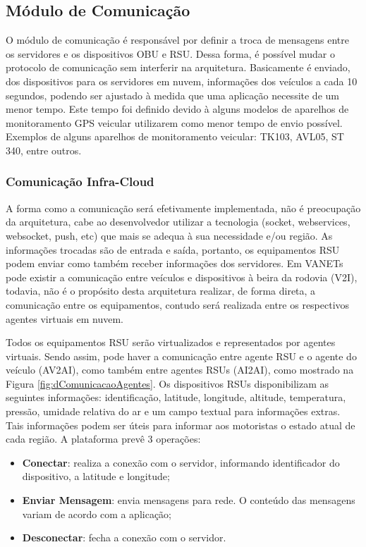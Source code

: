 \documentclass[
	12pt,				%
	oneside,			%
	a4paper,			%
	english,			%
	brazil				%
	]{abntex2ppgsi}
\begin{document}
\subsection{Módulo de Comunicação}

O módulo de comunicação é responsável por definir a troca de mensagens entre os servidores e os dispositivos  OBU e RSU. Dessa forma, é possível mudar o protocolo de comunicação sem interferir na arquitetura. Basicamente é enviado, dos dispositivos para os servidores em nuvem, informações dos veículos a cada 10 segundos, podendo ser ajustado à medida que uma aplicação necessite de um menor tempo. Este tempo foi definido devido à alguns modelos de aparelhos de monitoramento GPS veicular utilizarem como menor tempo de envio possível. Exemplos de alguns aparelhos de monitoramento veicular: TK103, AVL05, ST 340, entre outros.

\subsubsection{Comunicação Infra-Cloud}

A forma como a comunicação será efetivamente implementada, não é preocupação da arquitetura, cabe ao desenvolvedor utilizar a tecnologia (socket, webservices, websocket, push, etc) que mais se adequa à sua necessidade e/ou região. As informações trocadas são de entrada e saída, portanto, os equipamentos RSU podem enviar como também receber informações dos servidores. Em VANETs pode existir a comunicação entre veículos e dispositivos à beira da rodovia (V2I), todavia, não é o propósito desta arquitetura realizar, de forma direta, a comunicação entre os equipamentos, contudo será realizada entre os respectivos agentes virtuais em nuvem. 

Todos os equipamentos RSU serão virtualizados e representados por agentes virtuais. Sendo assim, pode haver a comunicação entre agente RSU e o agente do veículo (AV2AI), como também entre agentes RSUs (AI2AI), como mostrado na Figura \ref{fig:dComunicacaoAgentes}. Os dispositivos RSUs disponibilizam as seguintes informações: identificação, latitude, longitude, altitude, temperatura, pressão, umidade relativa do ar e um campo textual para informações extras. Tais informações podem ser úteis para informar aos motoristas o estado atual de cada região. A plataforma prevê  3 operações:

\begin{itemize}
	\item{\textbf{Conectar}: realiza a conexão com o servidor, informando identificador do dispositivo, a latitude e longitude;}	
	\item{\textbf{Enviar Mensagem}: envia mensagens para rede. O conteúdo das mensagens variam de acordo com a aplicação;}	
	\item{\textbf{Desconectar}: fecha a conexão com o servidor.}	
\end{itemize} 
\end{document}
